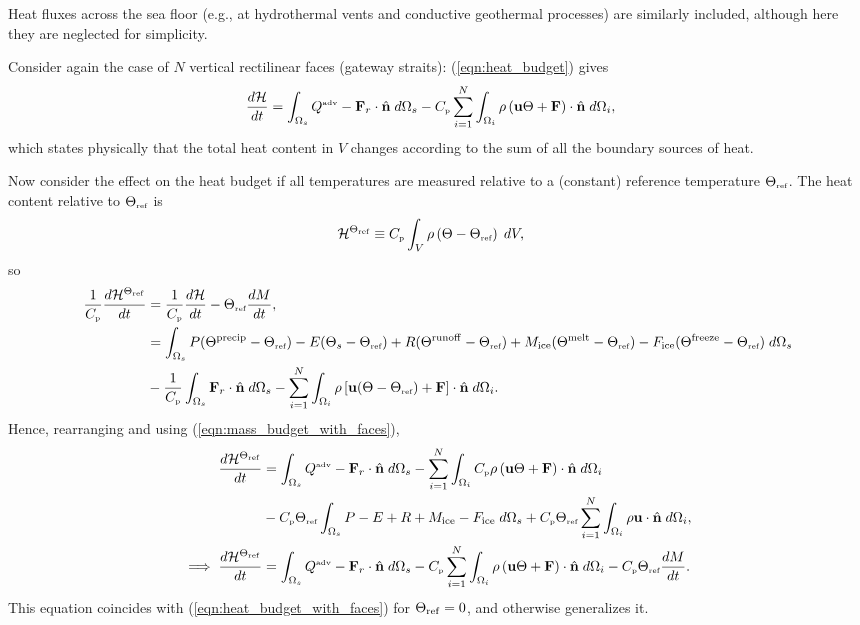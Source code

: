 \documentclass[10pt]{amsart}
\newcommand{\Cp}{C_{\mbox{\tiny p}}}
\newcommand{\Qadv}{Q^{\mbox{\tiny adv}}}
\newcommand{\surf}{\Omega}
\newcommand{\Thref}{\Theta_{\mbox{\tiny ref}}}
\newcommand{\Heat}{{\mathcal H}^{\Thref}}
\begin{document}
Heat fluxes across the sea floor (e.g., at hydrothermal vents and conductive geothermal processes) are similarly included, although here they are neglected for simplicity.

Consider again the case of $N$ vertical rectilinear faces (gateway straits): (\ref{eqn:heat_budget}) gives
\begin{align}
\frac{d{\mathcal H}}{dt} & = \int_{\surf_s} \Qadv - {\bf F}_{r} \cdot {\hat{\bf n}} \; d\surf_s  - \Cp \sum_{i=1}^N \int_{\surf_i}  \rho \left( {\bf u} \Theta + {\bf F} \right)   \cdot {\hat{\bf n}}  \; d \surf_i ,
\label{eqn:heat_budget_with_faces}
\end{align}
which states physically that the total heat content in $V$ changes according to the sum of all the boundary sources of heat.

Now consider the effect on the heat budget if all temperatures are measured relative to a (constant) reference temperature $\Thref$.
The heat content relative to $\Thref$ is
\begin{align}
\Heat & \equiv  \Cp \int_V\rho \left( \Theta - \Thref \right)  \; d V  ,
\end{align}
so
\begin{align}
\frac{1}{\Cp}\frac{d\Heat}{dt} &= \frac{1}{\Cp} \frac{d {\mathcal H}}{dt} - \Thref \frac{d M}{d t} , \nonumber \\
&= \int_{\surf_s} P (\Theta^{\mathrm{precip}} - \Thref)  - E (\Theta_s  - \Thref) +  R (\Theta^\mathrm{runoff}  - \Thref)  +
M_{\mathrm{ice}}  (\Theta^\mathrm{melt} - \Thref) - F_{\mathrm{ice}}  (\Theta^\mathrm{freeze}  - \Thref)  \; d\surf_s  \nonumber \\ 
&- \frac{1}{\Cp} \int_{\surf_s} {\bf F}_{r} \cdot {\hat{\bf n}} \; d\surf_s  
- \sum_{i=1}^N \int_{\surf_i} \rho \left[ {\bf u} (\Theta  - \Thref)+ {\bf F} \right]   \cdot {\hat{\bf n}}  \; d \surf_i . 
\label{eqn:heat_budget_with_faces_Thref0}
\end{align}
Hence, rearranging and using (\ref{eqn:mass_budget_with_faces}),
\begin{align}
\frac{d\Heat}{dt} & = \int_{\surf_s} \Qadv - {\bf F}_{r} \cdot {\hat{\bf n}} \; d\surf_s  - \sum_{i=1}^N \int_{\surf_i} \Cp \rho \left( {\bf u} \Theta + {\bf F} \right)   \cdot {\hat{\bf n}}  \; d \surf_i \nonumber \\
&- \Cp \Thref \int_{\surf_s} P  - E +  R  + M_{\mathrm{ice}} - F_{\mathrm{ice}}  \; d\surf_s + \Cp \Thref \sum_{i=1}^N \int_{\surf_i} \rho {\bf u}    \cdot {\hat{\bf n}}  \; d \surf_i , \nonumber \\
\implies
\frac{d\Heat}{dt} & = \int_{\surf_s} \Qadv - {\bf F}_{r} \cdot {\hat{\bf n}} \; d\surf_s  - \Cp \sum_{i=1}^N \int_{\surf_i} \rho \left( {\bf u} \Theta + {\bf F} \right)   \cdot {\hat{\bf n}}  \; d \surf_i - \Cp \Thref \frac{dM}{dt} .
\label{eqn:heat_budget_with_faces_Thref}
\end{align}
This equation coincides with (\ref{eqn:heat_budget_with_faces}) for $\Theta_{\rm ref} = 0$, and otherwise generalizes it.
\end{document}
